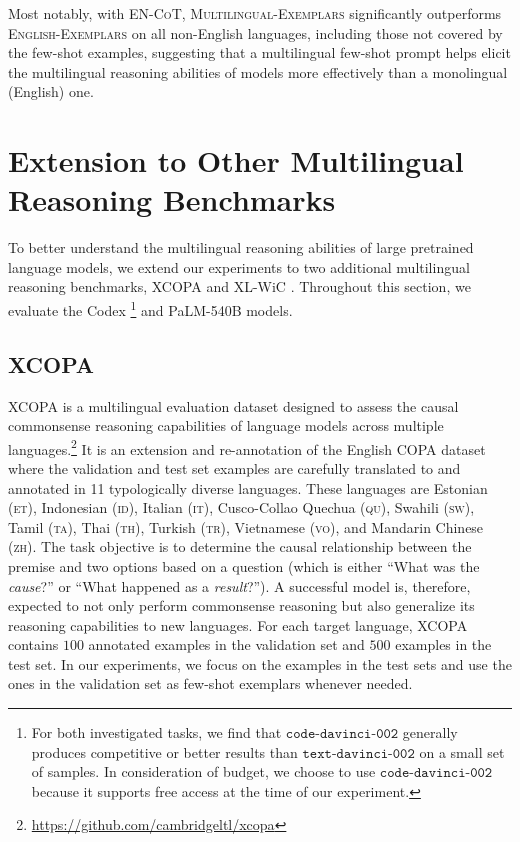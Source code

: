 Most notably, with \textsc{EN-CoT}, \textsc{Multilingual-Exemplars} significantly outperforms \textsc{English-Exemplars} on all non-English languages, including those not covered by the few-shot examples, suggesting that a multilingual few-shot prompt helps elicit the multilingual reasoning abilities of models more effectively than a monolingual (English) one. 

\section{Extension to Other Multilingual Reasoning Benchmarks}
\label{sec:expr-others}
To better understand the multilingual reasoning abilities of large pretrained language models, we extend our experiments to two additional multilingual reasoning benchmarks, {XCOPA} \citep{ponti-etal-2020-xcopa} and {XL-WiC} \citep{raganato-etal-2020-xl}. Throughout this section, we evaluate the Codex \citep[$\mathtt{code}$-$\mathtt{davinci}$-$\mathtt{002}$;][]{chen2021evaluating}\footnote{For both investigated tasks, we find that $\mathtt{code}$-$\mathtt{davinci}$-$\mathtt{002}$ generally produces competitive or better results than $\mathtt{text}$-$\mathtt{davinci}$-$\mathtt{002}$ on a small set of samples. In consideration of budget, we choose to use $\mathtt{code}$-$\mathtt{davinci}$-$\mathtt{002}$ because it supports free access at the time of our experiment. } and PaLM-540B models.

\subsection{XCOPA}
\label{sec:results-xcopa}

{XCOPA} is a multilingual evaluation dataset designed to assess the causal commonsense reasoning capabilities of language models across multiple languages.\footnote{\url{https://github.com/cambridgeltl/xcopa}} It is an extension and re-annotation of the English COPA dataset \citep{gordon-etal-2012-semeval} where the validation and test set examples are carefully translated to and annotated in 11 typologically diverse languages. These languages are Estonian (\textsc{et}), Indonesian (\textsc{id}), Italian (\textsc{it}), Cusco-Collao Quechua (\textsc{qu}), Swahili (\textsc{sw}), Tamil (\textsc{ta}), Thai (\textsc{th}), Turkish (\textsc{tr}), Vietnamese (\textsc{vo}), and Mandarin Chinese (\textsc{zh}). The task objective is to determine the causal relationship between the premise and two options based on a question (which is either ``What was the \emph{cause}?'' or ``What happened as a \emph{result}?''). A successful model is, therefore, expected to not only perform commonsense reasoning but also generalize its reasoning capabilities to new languages. For each target language, {XCOPA} contains $100$ annotated examples in the validation set and $500$ examples in the test set. In our experiments, we focus on the examples in the test sets and use the ones in the validation set as few-shot exemplars whenever needed.

